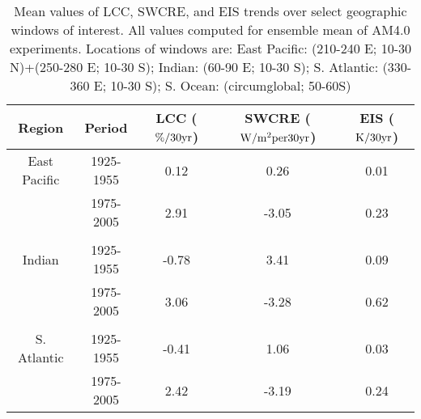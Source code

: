 \documentclass[draft,grl]{agutexSI}
\begin{document}
\begin{table}
    \caption{Mean values of LCC, SWCRE, and EIS trends over select geographic windows of interest.  All values computed for ensemble mean of AM4.0 experiments.  Locations of windows are: East Pacific: (210-240 E; 10-30 N)+(250-280 E; 10-30 S); Indian: (60-90 E; 10-30 S); S. Atlantic: (330-360 E; 10-30 S); S. Ocean: (circumglobal; 50-60S)}
    \begin{center}
    \begin{tabular}{*{5}{c}}
    \hline
    \hline
    Region   &    Period   &  LCC ($\% / 30 \rm{yr}$)                   & SWCRE ($\rm{W/m^2 per 30 \rm{yr}}$)     &   EIS  ($\rm{K} / 30 \rm{yr}$) \\ \hline
    East Pacific           &   1925-1955  &   0.12                                               &        0.26      &    0.01                              \\
                                         &    1975-2005 &   2.91                                               &       -3.05     &     0.23    \\
    \\
    Indian                     &   1925-1955    &   -0.78                                           &         3.41     &   0.09                    \\ 
                                         &    1975-2005    &   3.06                                            &        -3.28     &   0.62       \\
    \\
    S. Atlantic            &   1925-1955    & -0.41                                             &        1.06      &   0.03                          \\ 
                                        &    1975-2005    &  2.42                                             &       -3.19      &   0.24  \\

\end{tabular}
\end{center}
\end{table}
\end{document}
